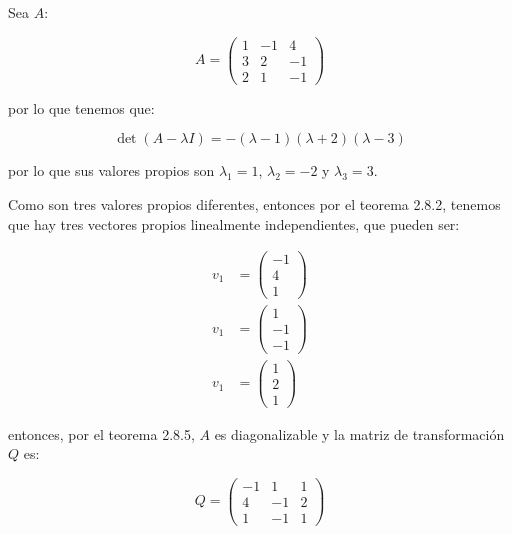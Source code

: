 		\begin{ejemplo}
			Sea $A$:

			\begin{equation*}
				A =
				\begin{pmatrix}
					1 & -1 & 4 \\
					3 & 2 & -1 \\
					2 & 1 & -1
				\end{pmatrix}
			\end{equation*}

			por lo que tenemos que:

			\begin{equation*}
				\det{(A - \lambda I)} = - (\lambda - 1)(\lambda + 2)(\lambda - 3)
			\end{equation*}

			por lo que sus valores propios son $\lambda_1 = 1$, $\lambda_2 = -2$ y $\lambda_3 = 3$.

			Como son tres valores propios diferentes, entonces por el teorema 2.8.2, tenemos que hay tres vectores propios linealmente independientes, que pueden ser:

			\begin{align*}
				v_1 &= \begin{pmatrix} -1 \\ 4 \\ 1 \end{pmatrix} \\
				v_1 &= \begin{pmatrix} 1 \\ -1 \\ -1 \end{pmatrix} \\
				v_1 &= \begin{pmatrix} 1 \\ 2 \\ 1 \end{pmatrix}
			\end{align*}

			entonces, por el teorema 2.8.5, $A$ es diagonalizable y la matriz de transformación $Q$ es:

			\begin{equation*}
				Q =
				\begin{pmatrix}
					-1 & 1 & 1 \\
					4 & -1 & 2 \\
					1 & -1 & 1
				\end{pmatrix}
			\end{equation*}


\end{ejemplo}
